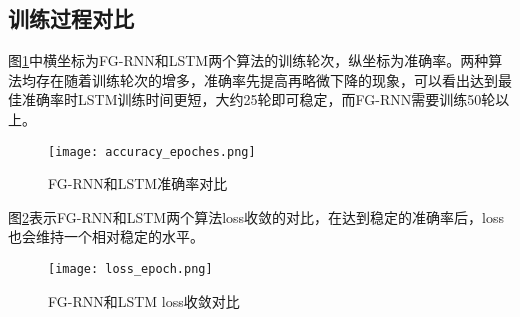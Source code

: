 


\subsection{训练过程对比}
图\ref{fig:FG-RNN和LSTM准确率对比}中横坐标为FG-RNN和LSTM两个算法的训练轮次，纵坐标为准确率。两种算法均存在随着训练轮次的增多，准确率先提高再略微下降的现象，可以看出达到最佳准确率时LSTM训练时间更短，大约25轮即可稳定，而FG-RNN需要训练50轮以上。

\begin{figure}[H]
    \centering
    \texttt{[image: accuracy\_epoches.png]}
    \caption{FG-RNN和LSTM准确率对比}
    \label{fig:FG-RNN和LSTM准确率对比}
  \end{figure}

图\ref{fig:FG-RNN和LSTM loss收敛对比}表示FG-RNN和LSTM两个算法loss收敛的对比，在达到稳定的准确率后，loss也会维持一个相对稳定的水平。
  \begin{figure}[H]
    \centering
    \texttt{[image: loss\_epoch.png]}
    \caption{FG-RNN和LSTM loss收敛对比}
    \label{fig:FG-RNN和LSTM loss收敛对比}
  \end{figure}


